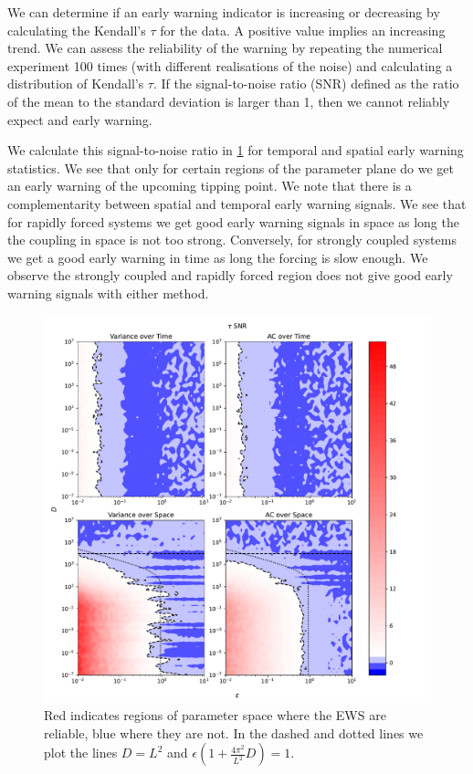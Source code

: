     We can determine if an early warning indicator is increasing or decreasing by calculating the Kendall's $\tau$ for the data.
    A positive value implies an increasing trend\cite{Wilks2011}. We can assess the reliability of the warning by repeating the numerical
    experiment 100 times (with different realisations of the noise) and calculating a distribution of Kendall's $\tau$. If the signal-to-noise ratio
    (SNR) defined as the ratio of the mean to the standard deviation is larger than 1, then we cannot reliably expect and early warning.

    We calculate this signal-to-noise ratio in \cref{fig:parameter_plane} for temporal and spatial early warning statistics. We see that only for
    certain regions of the parameter plane do we get an early warning of the upcoming tipping point. We note that there is a complementarity between spatial
    and temporal early warning signals. We see that for rapidly forced systems we get good early warning signals in space as long the
    the coupling in space is not too strong. Conversely, for strongly coupled systems we get 
    a good early warning in time as long the forcing is slow enough. We observe the strongly
    coupled and rapidly forced region does not give good early warning signals with either method.

    \begin{figure}
      \centering
      \includegraphics[width=\textwidth,keepaspectratio]{parameter_plane}
      \caption[The quality of early warning signals in the $epsilon$ and $D$ plane]{Red indicates regions of parameter space where the EWS are reliable, blue
        where they are not. In the dashed and dotted lines we plot the lines $D=L^2$ and
        $\epsilon(1+\frac{4\pi^2}{L^2} D) = 1$.}
      \label{fig:parameter_plane}
    \end{figure}
